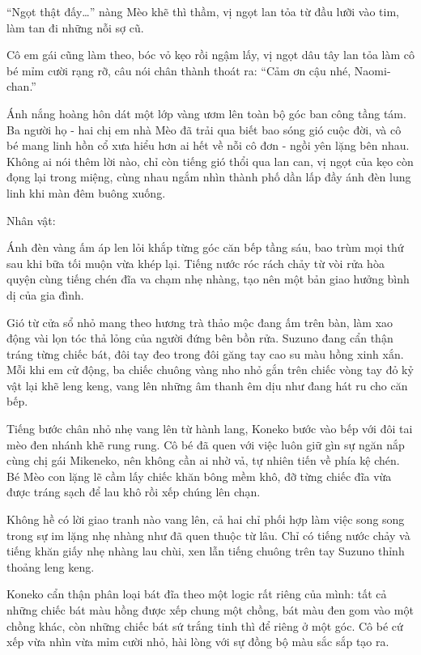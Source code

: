 ﻿\documentclass[../main.tex]{subfiles}
\begin{document}
``Ngọt thật đấy\dots'' nàng Mèo khẽ thì thầm, vị ngọt lan tỏa từ đầu lưỡi vào tim, làm tan đi những nỗi sợ cũ.

Cô em gái cũng làm theo, bóc vỏ kẹo rồi ngậm lấy, vị ngọt dâu tây lan tỏa làm cô bé mỉm cười rạng rỡ, câu nói chân thành thoát ra: ``Cảm ơn cậu nhé, Naomi-chan.''

Ánh nắng hoàng hôn dát một lớp vàng ươm lên toàn bộ góc ban công tầng tám. Ba người họ - hai chị em nhà Mèo đã trải qua biết bao sóng gió cuộc đời, và cô bé mang linh hồn cổ xưa hiểu hơn ai hết về nỗi cô đơn - ngồi yên lặng bên nhau. Không ai nói thêm lời nào, chỉ còn tiếng gió thổi qua lan can, vị ngọt của kẹo còn đọng lại trong miệng, cùng nhau ngắm nhìn thành phố dần lấp đầy ánh đèn lung linh khi màn đêm buông xuống.

\newpage

\begin{center}
    {\caviar\fontsize{12pt}{12pt}\selectfont Nhân vật:  }
\end{center}

Ánh đèn vàng ấm áp len lỏi khắp từng góc căn bếp tầng sáu, bao trùm mọi thứ sau khi bữa tối muộn vừa khép lại. Tiếng nước róc rách chảy từ vòi rửa hòa quyện cùng tiếng chén đĩa va chạm nhẹ nhàng, tạo nên một bản giao hưởng bình dị của gia đình.

Gió từ cửa sổ nhỏ mang theo hương trà thảo mộc đang ấm trên bàn, làm xao động vài lọn tóc thả lỏng của người đứng bên bồn rửa. Suzuno đang cẩn thận tráng từng chiếc bát, đôi tay đeo trong đôi găng tay cao su màu hồng xinh xắn. Mỗi khi em cử động, ba chiếc chuông vàng nho nhỏ gắn trên chiếc vòng tay đỏ kỷ vật lại khẽ leng keng, vang lên những âm thanh êm dịu như đang hát ru cho căn bếp.

Tiếng bước chân nhỏ nhẹ vang lên từ hành lang, Koneko bước vào bếp với đôi tai mèo đen nhánh khẽ rung rung. Cô bé đã quen với việc luôn giữ gìn sự ngăn nắp cùng chị gái Mikeneko, nên không cần ai nhờ vả, tự nhiên tiến về phía kệ chén. Bé Mèo con lặng lẽ cầm lấy chiếc khăn bông mềm khô, đỡ từng chiếc đĩa vừa được tráng sạch để lau khô rồi xếp chúng lên chạn.

Không hề có lời giao tranh nào vang lên, cả hai chỉ phối hợp làm việc song song trong sự im lặng nhẹ nhàng như đã quen thuộc từ lâu. Chỉ có tiếng nước chảy và tiếng khăn giấy nhẹ nhàng lau chùi, xen lẫn tiếng chuông trên tay Suzuno thỉnh thoảng leng keng.

Koneko cẩn thận phân loại bát đĩa theo một logic rất riêng của mình: tất cả những chiếc bát màu hồng được xếp chung một chồng, bát màu đen gom vào một chồng khác, còn những chiếc bát sứ trắng tinh thì để riêng ở một góc. Cô bé cứ xếp vừa nhìn vừa mỉm cười nhỏ, hài lòng với sự đồng bộ màu sắc sắp tạo ra.
\end{document}
